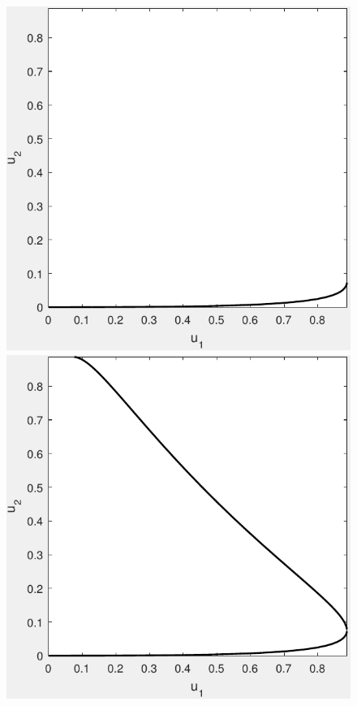 		\begin{figure}[ht]
			\centering
			\begin{minipage}[b]{0.3\linewidth}
				\includegraphics[width=\textwidth]{GammaTrace01}
			\end{minipage}
			\begin{minipage}[b]{0.3\linewidth}
				\includegraphics[width=\textwidth]{GammaTrace02}

\end{minipage}
\end{figure}
